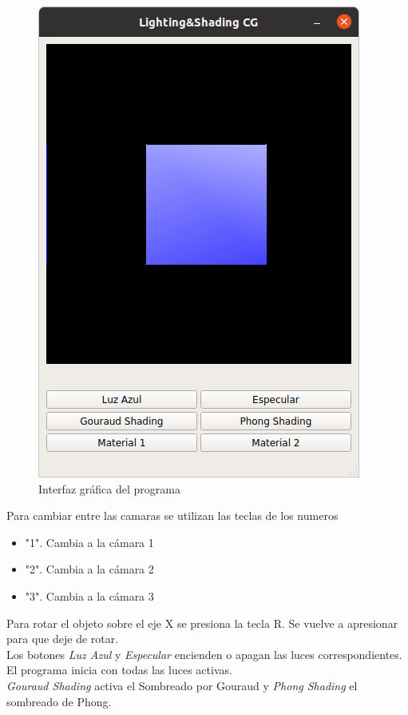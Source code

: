 \documentclass[12pt]{article}
\begin{document}
\begin{figure}[H]
\centering
\includegraphics[scale=0.5]{images/gui.png}
\caption{Interfaz gráfica del programa}
\end{figure}

Para cambiar entre las camaras se utilizan las teclas de los numeros
\begin{itemize}
\item "1". Cambia a la cámara 1
\item "2". Cambia a la cámara 2
\item "3". Cambia a la cámara 3

\end{itemize}

 

Para rotar el objeto sobre el eje X se presiona la tecla R. Se vuelve a apresionar para que deje de rotar.
\\

Los botones \textit{Luz Azul} y \textit{Especular} encienden o apagan las luces correspondientes. El programa inicia con todas las luces activas.
\\

\textit{Gouraud Shading} activa el Sombreado por Gouraud y \textit{Phong Shading} el sombreado de Phong.
\\
\end{document}

